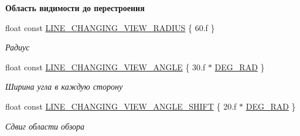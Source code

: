 \begin{Indent}\textbf{ Область видимости до перестроения}\par
\begin{DoxyCompactItemize}
\item 
\mbox{\label{namespacertm_a83f35114e81818841a5e8ae7463a8d5e}} 
float const \hyperlink{namespacertm_a83f35114e81818841a5e8ae7463a8d5e}{L\+I\+N\+E\+\_\+\+C\+H\+A\+N\+G\+I\+N\+G\+\_\+\+V\+I\+E\+W\+\_\+\+R\+A\+D\+I\+US} \{ 60.f \}
\begin{DoxyCompactList}\small\item\em Радиус \end{DoxyCompactList}\item 
\mbox{\label{namespacertm_aeb42dcb687f8cae295280ee962474804}} 
float const \hyperlink{namespacertm_aeb42dcb687f8cae295280ee962474804}{L\+I\+N\+E\+\_\+\+C\+H\+A\+N\+G\+I\+N\+G\+\_\+\+V\+I\+E\+W\+\_\+\+A\+N\+G\+LE} \{ 30.f $\ast$ \hyperlink{namespacertm_a797faf3037681ed7bc153db9eca6155e}{D\+E\+G\+\_\+\+R\+AD} \}
\begin{DoxyCompactList}\small\item\em Ширина угла в каждую сторону \end{DoxyCompactList}\item 
\mbox{\label{namespacertm_acf2e734084d7bb5ff2828b1db966cae6}} 
float const \hyperlink{namespacertm_acf2e734084d7bb5ff2828b1db966cae6}{L\+I\+N\+E\+\_\+\+C\+H\+A\+N\+G\+I\+N\+G\+\_\+\+V\+I\+E\+W\+\_\+\+A\+N\+G\+L\+E\+\_\+\+S\+H\+I\+FT} \{ 20.f $\ast$ \hyperlink{namespacertm_a797faf3037681ed7bc153db9eca6155e}{D\+E\+G\+\_\+\+R\+AD} \}
\begin{DoxyCompactList}\small\item\em Сдвиг области обзора \end{DoxyCompactList}\end{DoxyCompactItemize}
\end{Indent}

